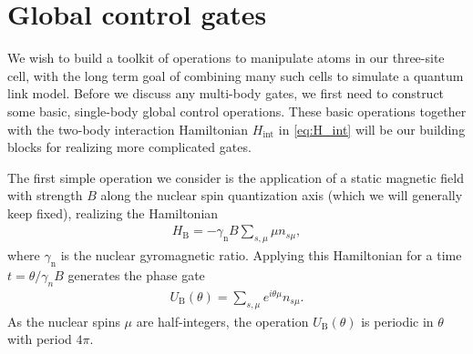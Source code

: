 \documentclass[aps,nofootinbib,notitlepage,11pt]{revtex4-1}
\renewcommand{\t}{\text} %
\newcommand{\p}[1]{\left(#1\right)} %
\newcommand{\B}{\text{B}}
\newcommand{\1}{\mathds{1}}
\begin{document}
\section{Global control gates}
\label{sec:global_control}

We wish to build a toolkit of operations to manipulate atoms in our
three-site cell, with the long term goal of combining many such cells
to simulate a quantum link model.  Before we discuss any multi-body
gates, we first need to construct some basic, single-body global
control operations.  These basic operations together with the two-body
interaction Hamiltonian $H_{\t{int}}$ in \eqref{eq:H_int} will be our
building blocks for realizing more complicated gates.

The first simple operation we consider is the application of a static
magnetic field with strength $B$ along the nuclear spin quantization
axis (which we will generally keep fixed), realizing the Hamiltonian
\begin{align}
  H_\B = -\gamma_{\text{n}} B \sum_{s,\mu} \mu n_{s\mu},
\end{align}
where $\gamma_{\text{n}}$ is the nuclear gyromagnetic ratio.  Applying
this Hamiltonian for a time $t=\theta/\gamma_nB$ generates the phase
gate
\begin{align}
  U_\B\p{\theta} = \sum_{s,\mu} e^{i \theta \mu} n_{s\mu}.
\end{align}
As the nuclear spins $\mu$ are half-integers, the operation
$U_\B\p{\theta}$ is periodic in $\theta$ with period $4\pi$.
\end{document}
